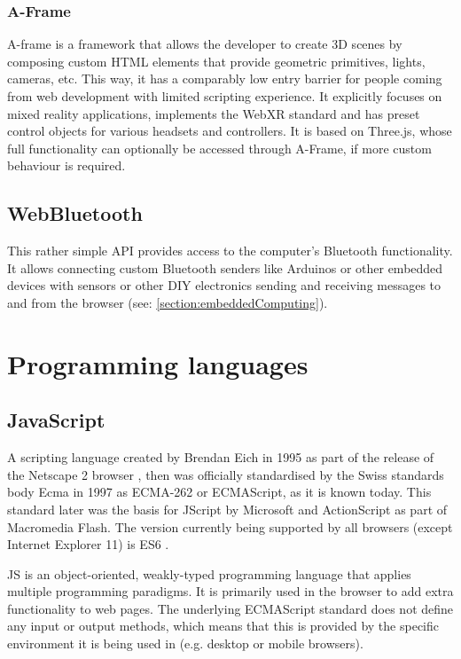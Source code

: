 \subsubsection{A-Frame}

A-frame is a framework that allows the developer to create \ac{3D} scenes by composing custom HTML elements that provide geometric primitives, lights, cameras, etc. This way, it has a comparably low entry barrier for people coming from web development with limited scripting experience. It explicitly focuses on mixed reality applications, implements the WebXR standard and has preset control objects for various headsets and controllers. It is based on Three.js, whose full functionality can optionally be accessed through A-Frame, if more custom behaviour is required.

\subsection{WebBluetooth}

This rather simple \ac{API} provides access to the computer's Bluetooth functionality. It allows connecting custom Bluetooth senders like Arduinos or other embedded devices with sensors or other \ac{DIY} electronics sending and receiving messages to and from the browser (see: \autoref{section:embeddedComputing}).

\section{Programming languages}
\label{section:programmingLanguages}



\subsection{JavaScript}

A scripting language created by Brendan Eich in 1995 as part of the release of the Netscape 2 browser \parencite{javascriptRelease}, then was officially standardised by the Swiss standards body Ecma in 1997 as ECMA-262 or ECMAScript, as it is known today. This standard later was the basis for JScript by Microsoft and ActionScript as part of Macromedia Flash. The version currently being supported by all browsers (except Internet Explorer 11) is \ac{ES6} \parencite{javascriptHistory}.

\ac{JS} is an object-oriented, weakly-typed programming language that applies multiple programming paradigms. It is primarily used in the browser to add extra functionality to web pages. The underlying ECMAScript standard does not define any input or output methods, which means that this is provided by the specific environment it is being used in (e.g. desktop or mobile browsers).

